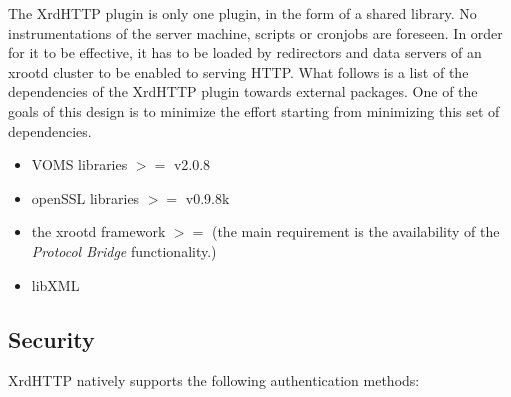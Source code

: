 \documentclass[12pt]{article} %
\begin{document}
The XrdHTTP plugin is only one plugin, in the form of a shared library. No instrumentations of the server machine, scripts or cronjobs are foreseen. In order for it to be effective, it has to be loaded by redirectors and data servers of an xrootd cluster to be enabled to serving HTTP. What follows is a list of the dependencies of the XrdHTTP plugin towards external packages. One of the goals of this design is to minimize the effort starting from minimizing this set of dependencies.\\

\begin{itemize}
 \item VOMS libraries $>=$ v2.0.8
 \item openSSL libraries $>=$ v0.9.8k
 \item the xrootd framework $>=$ (the main  requirement is the availability of the \textit{Protocol Bridge} functionality.)
 \item libXML
\end{itemize}


\subsection{Security}

XrdHTTP natively supports the following authentication methods:
\end{document}
